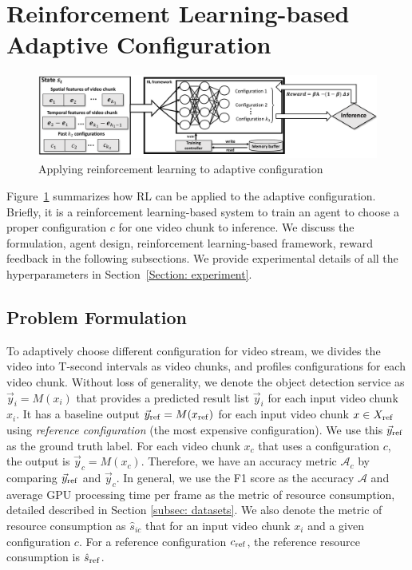 \section{Reinforcement Learning-based Adaptive Configuration}
\label{Section: design}

\begin{figure}[!t]
	\centerline{\includegraphics[width=0.9\linewidth]{figures/framework2.pdf}}
	\caption{Applying reinforcement learning to adaptive configuration}
	\label{fig: DQN}
	\vspace{-0.5cm}
\end{figure}

Figure~\ref{fig: DQN} summarizes how RL can be applied to the adaptive configuration. Briefly, it is a reinforcement learning-based system to train an agent to choose a proper configuration $ c $ for one video chunk to inference. We discuss the formulation, agent design, reinforcement learning-based framework, reward feedback in the following subsections. We provide experimental details of all the hyperparameters in Section~\ref{Section: experiment}. %

\subsection{Problem Formulation}
\label{subsec: formulation}

To adaptively choose different configuration for video stream, we divides the video into T-second intervals as video chunks, and profiles configurations for each video chunk. Without loss of generality, we denote the object detection service as $ \vec{y}_i = M(x_i) $ that provides a predicted result list $ \vec{y}_i $ for each input video chunk $ x_i $. It has a baseline output $ \vec{y}_{\rm ref} = M(x_{\rm ref}) $ for each input video chunk $ x \in X_{\rm ref} $ using \emph{reference configuration} (the most expensive configuration). We use this $ \vec{y}_{\rm ref} $ as the ground truth label. For each video chunk $ x_c $ that uses a configuration $ c $, the output is $ \vec{y}_c = M(x_c) $. Therefore, we have an accuracy metric $ \mathcal{A}_c $ by comparing $ \vec{y}_{\rm ref} $ and $ \vec{y}_c $. In general, we use the F1 score as the accuracy $ \mathcal{A} $ and average GPU processing time per frame as the metric of resource consumption, detailed described in Section \ref{subsec: datasets}. We also denote the metric of resource consumption as $ \hat{s}_{ic} $ that for an input video chunk $ x_i $ and a given configuration $ c $. For a reference configuration $ c_{\rm ref} $, the reference resource consumption is $ \hat{s}_{\rm ref} $.

